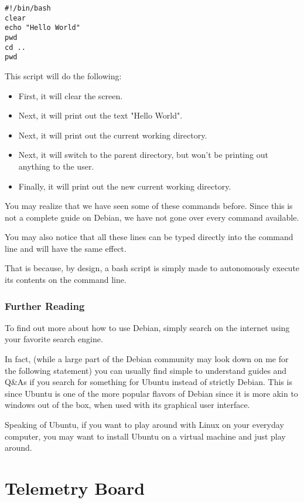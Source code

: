 \documentclass[12pt,article]{memoir}
\begin{document}
\begin{lstlisting}
#!/bin/bash
clear
echo "Hello World"
pwd
cd ..
pwd
\end{lstlisting}
This script will do the following:\par
\begin{itemize}
	\item First, it will clear the screen.
	\item Next, it will print out the text "Hello World".
	\item Next, it will print out the current working directory.
	\item Next, it will switch to the parent directory, but won’t be printing out anything to the user.
	\item Finally, it will print out the new current working directory.
\end{itemize}

You may realize that we have seen some of these commands before. Since this is not a complete guide on Debian, we have not gone over every command available.\par
You may also notice that all these lines can be typed directly into the command line and will have the same effect.\par
That is because, by design, a bash script is simply made to autonomously execute its contents on the command line.\par

\newpage
\subsection{Further Reading}
To find out more about how to use Debian, simply search on the internet using your favorite search engine.\par
In fact, (while a large part of the Debian community may look down on me for the following statement) you can usually find simple to understand guides and Q\&As if you search for something for Ubuntu instead of strictly Debian. This is since Ubuntu is one of the more popular flavors of Debian since it is more akin to windows out of the box, when used with its graphical user interface.\par
Speaking of Ubuntu, if you want to play around with Linux on your everyday computer, you may want to install Ubuntu on a virtual machine and just play around.

\newpage
\chapter{Telemetry Board}
\end{document}
